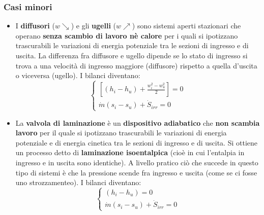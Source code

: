 \subsubsection{Casi minori}
\begin{itemize}
    \item I \textbf{diffusori} ($w \searrow$) e gli \textbf{ugelli} ($w \nearrow$) sono sistemi aperti stazionari che operano \textbf{senza scambio di lavoro nè calore} per i quali si ipotizzano trascurabili le variazioni di energia potenziale tra le sezioni di ingresso e di uscita.\newline
    La differenza fra diffusore e ugello dipende se lo stato di ingresso si trova a una velocità di ingresso maggiore (diffusore) rispetto a quella d'uscita o viceversa (ugello).\newline
    \newline
    I bilanci diventano:
    \[
        \begin{cases}
            \left[(h_i-h_u) + \frac{w_i^2 - w_u^2}{2}\right] = 0\\
            \dot{m} (s_i-s_u) + \dot{S}_{irr} =0 
        \end{cases}
    \]
    \item La \textbf{valvola di laminazione} è un \textbf{dispositivo adiabatico} che \textbf{non scambia lavoro} per il quale si ipotizzano trascurabili le variazioni di energia potenziale e di energia cinetica tra le sezioni di ingresso e di uscita. Si ottiene un processo detto di \textbf{laminazione isoentalpica} (cioè in cui l'entalpia in ingresso e in uscita sono identiche).\newline
    A livello pratico ciò che succede in questo tipo di sistemi è che la pressione scende fra ingresso e uscita (come se ci fosse uno strozzamenteo).\newline
    \newline
    I bilanci diventano:
    \[
        \begin{cases}
            (h_i- h_u) = 0\\
            \dot{m} (s_i-s_u) + \dot{S}_{irr} = 0
        \end{cases}
    \]
\end{itemize}
